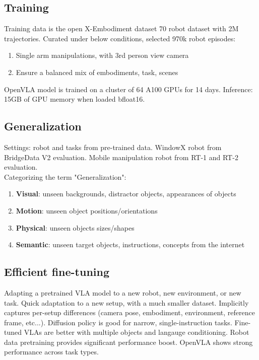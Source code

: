\subsection{Training}
Training data is the open X-Embodiment dataset 70 robot dataset with 2M trajectories. Curated under 
below conditions, selected 970k robot episodes:
\begin{enumerate}[label=(\arabic*), topsep=5pt, itemsep=1pt]
  \item Single arm manipulations, with 3rd person view camera 
  \item Ensure a balanced mix of embodiments, task, scenes
\end{enumerate}
OpenVLA model is trained on a cluster of 64 A100 GPUs for 14 days. Inference: 15GB of GPU memory when loaded bfloat16.

\subsection{Generalization}
Settings: robot and tasks from pre-trained data. WindowX robot from BridgeData V2 evaluation. Mobile manipulation robot from RT-1 and RT-2 evaluation. \\ 

\noindent Categorizing the term "Generalization":
\begin{enumerate}[label=, topsep=5pt, itemsep=0pt]
  \item \textbf{Visual}: unseen backgrounds, distractor objects, appearances of objects 
  \item \textbf{Motion}: unseen object positions/orientations 
  \item \textbf{Physical}: unseen objects sizes/shapes 
  \item \textbf{Semantic}: unseen target objects, instructions, concepts from the internet
\end{enumerate}

\subsection{Efficient fine-tuning}
Adapting a pretrained VLA model to a new robot, new environment, or new task. Quick adaptation to a new setup, with a much smaller dataset. Implicitly captures per-setup differences (camera pose, embodiment, environment, reference frame, etc...). Diffusion 
policy is good for narrow, single-instruction tasks. Fine-tuned VLAs are better with multiple objects and langauge conditioning. Robot data pretraining provides significant performance boost. OpenVLA shows strong 
performance across task types.
